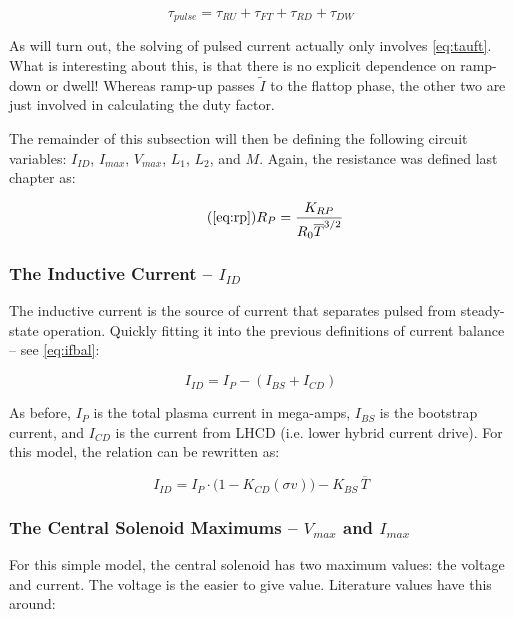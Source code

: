 \begin{equation}
	\tau_{pulse} = \tau_{RU} + \tau_{FT} + \tau_{RD} + \tau_{DW}
\end{equation}

As will turn out, the solving of pulsed current actually only involves \cref{eq:tauft}. What is interesting about this, is that there is no explicit dependence on ramp-down or dwell! Whereas ramp-up passes $\tilde I$ to the flattop phase, the other two are just involved in calculating the duty factor.

The remainder of this subsection will then be defining the following circuit variables: $I_{ID}$, $I_{max}$, $V_{max}$, $L_1$, $L_2$, and $M$. Again, the resistance was defined last chapter as:

\begin{equation}
	\tag{\ref{eq:rp}}
	R_P = \frac{K_{RP}}{R_0 \overline T ^ {3/2}}
\end{equation}

\subsubsection{The Inductive Current -- $I_{ID}$}

The inductive current is the source of current that separates pulsed from steady-state operation. Quickly fitting it into the previous definitions of current balance -- see \cref{eq:ifbal}:

\begin{equation}
	I_{ID} = I_P - ( I_{BS} + I_{CD} )
\end{equation}

As before, $I_P$ is the total plasma current in mega-amps, $I_{BS}$ is the bootstrap current, and $I_{CD}$ is the current from LHCD (i.e. lower hybrid current drive). For this model, the relation can be rewritten as:

\begin{equation}
	I_{ID} = I_P \cdot \Big( 1 - K_{CD} ( \sigma v ) \Big) - K_{BS} \, \overline T
\end{equation}

\subsubsection{The Central Solenoid Maximums -- $V_{max}$ and $I_{max}$}

For this simple model, the central solenoid has two maximum values: the voltage and current. The voltage is the easier to give value. Literature values have this around: \cite{arc}

